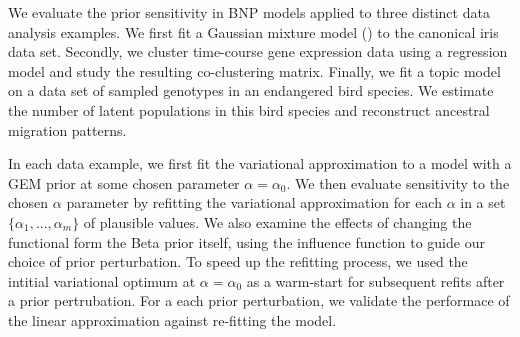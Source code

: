 We evaluate the prior sensitivity in BNP models applied to three distinct data analysis examples.
We first fit a Gaussian mixture model () to the canonical iris data set.
Secondly, we cluster time-course gene expression data using a regression model
and study the resulting co-clustering matrix.
Finally, we fit a topic model
on a data set of sampled genotypes in an endangered bird species.
We estimate the number of latent populations in this
bird species and reconstruct ancestral migration patterns.

In each data example, we first fit the variational approximation to a model
with a GEM prior at some chosen parameter $\alpha = \alpha_0$.
We then evaluate sensitivity to the chosen $\alpha$ parameter
by refitting the variational approximation for each $\alpha$
in a set $\{\alpha_1, ..., \alpha_m\}$ of plausible values.
We also examine the effects of changing the functional form the Beta prior itself,
using the influence function to guide our choice of prior perturbation.
To speed up the refitting process, we used the intitial
variational optimum at $\alpha = \alpha_0$ as a warm-start
for subsequent refits after a prior pertrubation.
For a each prior perturbation,
we validate the performace of the linear approximation against
re-fitting the model.
